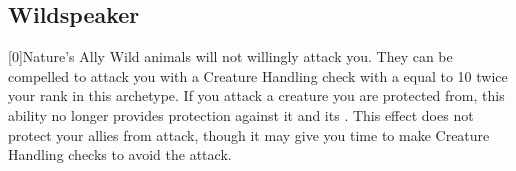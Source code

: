 



    \newpage
    \subsection{Wildspeaker}\label{Wildspeaker}

        [0]{Nature's Ally} Wild animals will not willingly attack you.
        They can be compelled to attack you with a Creature Handling check with a  equal to 10 \add twice your rank in this archetype.
        If you attack a creature you are protected from, this ability no longer provides protection against it and its .
        This effect does not protect your allies from attack, though it may give you time to make Creature Handling checks to avoid the attack.


